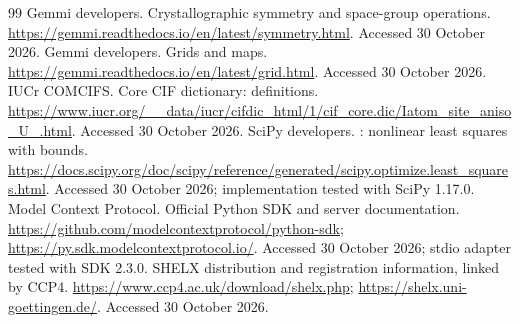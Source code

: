 \begin{thebibliography}{99}
 Gemmi developers. Crystallographic symmetry and space-group operations. \url{https://gemmi.readthedocs.io/en/latest/symmetry.html}. Accessed 30 October 2026.
 Gemmi developers. Grids and maps. \url{https://gemmi.readthedocs.io/en/latest/grid.html}. Accessed 30 October 2026.
 IUCr COMCIFS. Core CIF dictionary:  definitions. \url{https://www.iucr.org/__data/iucr/cifdic_html/1/cif_core.dic/Iatom_site_aniso_U_.html}. Accessed 30 October 2026.
 SciPy developers. : nonlinear least squares with bounds. \url{https://docs.scipy.org/doc/scipy/reference/generated/scipy.optimize.least_squares.html}. Accessed 30 October 2026; implementation tested with SciPy 1.17.0.
 Model Context Protocol. Official Python SDK and server documentation. \url{https://github.com/modelcontextprotocol/python-sdk}; \url{https://py.sdk.modelcontextprotocol.io/}. Accessed 30 October 2026; stdio adapter tested with SDK 2.3.0.
 SHELX distribution and registration information, linked by CCP4. \url{https://www.ccp4.ac.uk/download/shelx.php}; \url{https://shelx.uni-goettingen.de/}. Accessed 30 October 2026.
\end{thebibliography}
